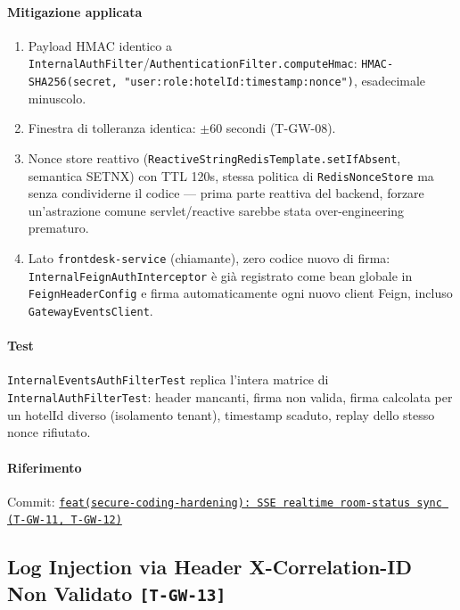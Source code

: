 ﻿\documentclass[a4paper,12pt]{report}
\newcommand{\commitref}[2]{\texttt{\small \href{https://github.com/diegoandruccioli/hotel-pms/commit/#1}{#2}}}
\newcommand{\threat}[1]{\texttt{\small\textcolor{vulnred}{[#1]}}}
\begin{document}
\paragraph{Mitigazione applicata}
\begin{enumerate}
  \item Payload HMAC identico a \texttt{InternalAuthFilter}/\texttt{AuthenticationFilter.computeHmac}:
    \texttt{HMAC-SHA256(secret, "user:role:hotelId:timestamp:nonce")}, esadecimale minuscolo.
  \item Finestra di tolleranza identica: $\pm$60 secondi (T-GW-08).
  \item Nonce store reattivo (\texttt{ReactiveStringRedisTemplate.setIfAbsent},
    semantica SETNX) con TTL 120s, stessa politica di \texttt{RedisNonceStore}
    ma senza condividerne il codice --- prima parte reattiva del backend,
    forzare un'astrazione comune servlet/reactive sarebbe stata
    over-engineering prematuro.
  \item Lato \texttt{frontdesk-service} (chiamante), zero codice nuovo di
    firma: \texttt{InternalFeignAuthInterceptor} è già registrato come bean
    globale in \texttt{FeignHeaderConfig} e firma automaticamente ogni nuovo
    client Feign, incluso \texttt{GatewayEventsClient}.
\end{enumerate}

\paragraph{Test}
\texttt{InternalEventsAuthFilterTest} replica l'intera matrice di
\texttt{InternalAuthFilterTest}: header mancanti, firma non valida, firma
calcolata per un hotelId diverso (isolamento tenant), timestamp scaduto,
replay dello stesso nonce rifiutato.

\paragraph{Riferimento} Commit: \commitref{a2620fc}{feat(secure-coding-hardening): SSE realtime room-status sync (T-GW-11, T-GW-12)}

\subsection{Log Injection via Header X-Correlation-ID Non Validato \threat{T-GW-13}}
\end{document}
